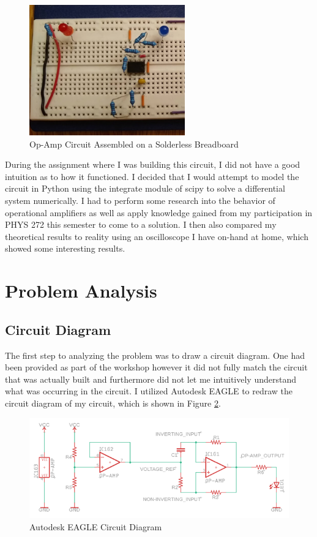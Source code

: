 \documentclass[12pt]{article}
\begin{document}
\begin{figure}[h!]
\centering
\includegraphics[width=0.6\textwidth]{breadboard.png}
\caption{Op-Amp Circuit Assembled on a Solderless Breadboard}
\label{fig:breadboard}
\end{figure}

During the assignment where I was building this circuit, I did not have a good intuition as to how it functioned. I decided that I would attempt to model the circuit in Python using the integrate module of scipy to solve a differential system numerically. I had to perform some research into the behavior of operational amplifiers as well as apply knowledge gained from my participation in PHYS 272 this semester to come to a solution. I then also compared my theoretical results to reality using an oscilloscope I have on-hand at home, which showed some interesting results.

\section{Problem Analysis}
\subsection{Circuit Diagram}
The first step to analyzing the problem was to draw a circuit diagram. One had been provided as part of the workshop however it did not fully match the circuit that was actually built and furthermore did not let me intuitively understand what was occurring in the circuit. I utilized Autodesk EAGLE to redraw the circuit diagram of my circuit, which is shown in Figure \ref{fig:circuit_diagram}.

\begin{figure}[h!]
\centering
\includegraphics[width=1.0\textwidth]{circuit_diagram.png}
\caption{Autodesk EAGLE Circuit Diagram}
\label{fig:circuit_diagram}
\end{figure}
\end{document}
